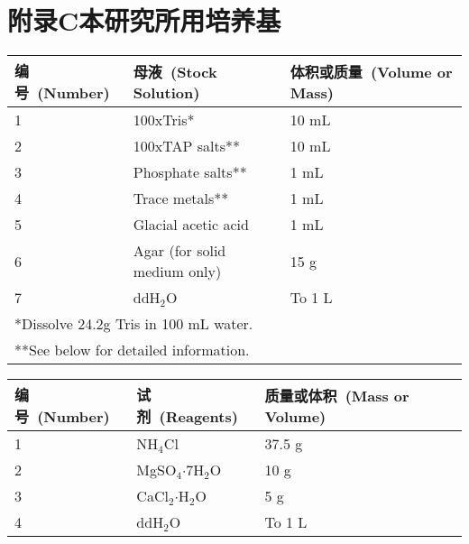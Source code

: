 \chapter{附录C\quad 本研究所用培养基}\label{appen:C}
\renewcommand{\leftmark}{附录C\quad 本研究所用培养基}
\setcounter{chapter}{3}
\setcounter{figure}{0}
\setcounter{table}{0}

\begin{table}[htbp]
\small
\centering
{
\par}
\begin{tabular*}{\textwidth}[c]{@{\extracolsep{\fill}}lll}
\toprule
编号\ (Number) & 母液\ (Stock Solution) & 体积或质量\ (Volume or Mass)\\
\midrule
1 & 100xTris* & 10 mL\\
2 & 100xTAP salts** & 10 mL\\
3 & Phosphate salts** & 1 mL\\
4 & Trace metals** & 1 mL\\
5 & Glacial acetic acid & 1 mL\\
6 & Agar (for solid medium only) & 15 g\\
7 & ddH$_2$O & To 1 L\\
\bottomrule
\multicolumn{2}{l}{*Dissolve 24.2g Tris in 100 mL water.}\\
\multicolumn{2}{l}{**See below for detailed information.}
\end{tabular*}
\end{table}

\vspace{35pt}

\begin{table}[htbp]
\small
\centering
{
\par}
\begin{tabular*}{\textwidth}[c]{@{\extracolsep{\fill}}lll}
\toprule
编号\ (Number) & 试剂\ (Reagents) & 质量或体积\ (Mass or Volume)\\
\midrule
1 & NH$_4$Cl & 37.5 g\\
2 & MgSO$_4$$\cdot$7H$_2$O & 10 g\\
3 & CaCl$_2$$\cdot$H$_2$O & 5 g\\
4 & ddH$_2$O & To 1 L\\
\bottomrule
\end{tabular*}
\end{table}

